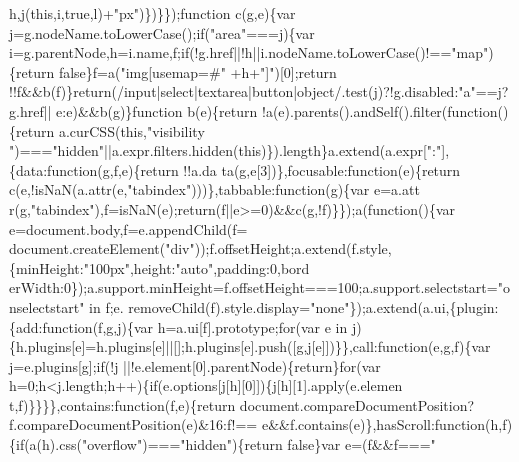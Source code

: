 \begin{DoxyCode}
      h,j(\textcolor{keyword}{this},i,\textcolor{keyword}{true},l)+\textcolor{stringliteral}{"px"})\})\}\});\textcolor{keyword}{function} c(g,e)\{var j=g.nodeName.toLowerCase();\textcolor{keywordflow}{if}(\textcolor{stringliteral}{"area"}===j)\{var 
      i=g.parentNode,h=i.name,f;\textcolor{keywordflow}{if}(!g.href||!h||i.nodeName.toLowerCase()!==\textcolor{stringliteral}{"map"})\{\textcolor{keywordflow}{return} \textcolor{keyword}{false}\}f=a(\textcolor{stringliteral}{"img[usemap=#"}
      +h+\textcolor{stringliteral}{"]"})[0];\textcolor{keywordflow}{return} !!f&&b(f)\}\textcolor{keywordflow}{return}(/input|select|textarea|button|\textcolor{keywordtype}{object}/.test(j)?!g.disabled:\textcolor{stringliteral}{"a"}==j?g.href||
      e:e)&&b(g)\}\textcolor{keyword}{function} b(e)\{\textcolor{keywordflow}{return} !a(e).parents().andSelf().filter(\textcolor{keyword}{function}()\{\textcolor{keywordflow}{return} a.curCSS(\textcolor{keyword}{this},\textcolor{stringliteral}{"visibility
      "})===\textcolor{stringliteral}{"hidden"}||a.expr.filters.hidden(\textcolor{keyword}{this})\}).length\}a.extend(a.expr[\textcolor{stringliteral}{":"}],\{data:function(g,f,e)\{return !!a.da
      ta(g,e[3])\},focusable:\textcolor{keyword}{function}(e)\{return c(e,!isNaN(a.attr(e,\textcolor{stringliteral}{"tabindex"})))\},tabbable:\textcolor{keyword}{function}(g)\{var e=a.att
      r(g,\textcolor{stringliteral}{"tabindex"}),f=isNaN(e);return(f||e>=0)&&c(g,!f)\}\});a(\textcolor{keyword}{function}()\{var e=document.body,f=e.appendChild(f=
      document.createElement(\textcolor{stringliteral}{"div"}));f.offsetHeight;a.extend(f.style,\{minHeight:\textcolor{stringliteral}{"100px"},height:\textcolor{stringliteral}{"auto"},padding:0,bord
      erWidth:0\});a.support.minHeight=f.offsetHeight===100;a.support.selectstart=\textcolor{stringliteral}{"onselectstart"} in f;e.
      removeChild(f).style.display=\textcolor{stringliteral}{"none"}\});a.extend(a.ui,\{plugin:\{add:function(f,g,j)\{var h=a.ui[f].prototype;for(var e in 
      j)\{h.plugins[e]=h.plugins[e]||[];h.plugins[e].push([g,j[e]])\}\},call:function(e,g,f)\{var j=e.plugins[g];if(!j
      ||!e.element[0].parentNode)\{return\}for(var h=0;h<j.length;h++)\{if(e.options[j[h][0]])\{j[h][1].apply(e.elemen
      t,f)\}\}\}\},contains:\textcolor{keyword}{function}(f,e)\{return document.compareDocumentPosition?f.compareDocumentPosition(e)&16:f!==
      e&&f.contains(e)\},hasScroll:\textcolor{keyword}{function}(h,f)\{if(a(h).css(\textcolor{stringliteral}{"overflow"})===\textcolor{stringliteral}{"hidden"})\{return false\}var e=(f&&f===\textcolor{stringliteral}{"
}
\end{DoxyCode}
